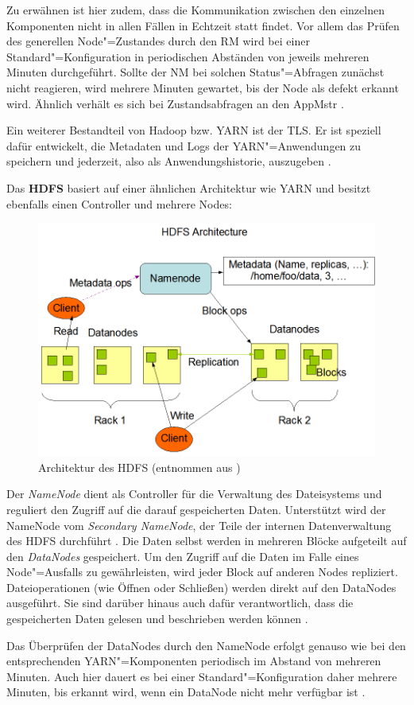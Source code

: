Zu erwähnen ist hier zudem, dass die Kommunikation zwischen den einzelnen Komponenten nicht in allen Fällen in Echtzeit statt findet.
Vor allem das Prüfen des generellen Node"=Zustandes durch den \ac{RM} wird bei einer Standard"=Konfiguration in periodischen Abständen von jeweils mehreren Minuten durchgeführt.
Sollte der \ac{NM} bei solchen Status"=Abfragen zunächst nicht reagieren, wird mehrere Minuten gewartet, bis der Node als defekt erkannt wird.
Ähnlich verhält es sich bei Zustandsabfragen an den \ac{AppMstr} \cite{HadoopYarnConfig271}.

Ein weiterer Bestandteil von Hadoop bzw. \ac{YARN} ist der \ac{TLS}.
Er ist speziell dafür entwickelt, die Metadaten und Logs der \ac{YARN}"=Anwendungen zu speichern und jederzeit, also als Anwendungshistorie, auszugeben \cite{HadoopYarnTlServer271}.

Das \textbf{\ac{HDFS}} basiert auf einer ähnlichen Architektur wie \ac{YARN} und besitzt ebenfalls einen Controller und mehrere Nodes:

\begin{figure}[h]
    \includegraphics{./images/hdfsarchitecture.png}
    \caption[Architektur des HDFS]
    {Architektur des \acs{HDFS} (entnommen aus \cite{HadoopHdfsDesc271})}
    \label{fig:hdfsarch}
\end{figure}

Der \emph{NameNode} dient als Controller für die Verwaltung des Dateisystems und reguliert den Zugriff auf die darauf gespeicherten Daten.
Unterstützt wird der NameNode vom \emph{Secondary NameNode}, der Teile der internen Datenverwaltung des \ac{HDFS} durchführt \cite{HadoopHdfsGuide271}.
Die Daten selbst werden in mehreren Blöcke aufgeteilt auf den \emph{DataNodes} gespeichert.
Um den Zugriff auf die Daten im Falle eines Node"=Ausfalls zu gewährleisten, wird jeder Block auf anderen Nodes repliziert.
Dateioperationen (wie Öffnen oder Schließen) werden direkt auf den DataNodes ausgeführt.
Sie sind darüber hinaus auch dafür verantwortlich, dass die gespeicherten Daten gelesen und beschrieben werden können \cite{HadoopHdfsDesc271}.

Das Überprüfen der DataNodes durch den NameNode erfolgt genauso wie bei den entsprechenden \ac{YARN}"=Komponenten periodisch im Abstand von mehreren Minuten.
Auch hier dauert es bei einer Standard"=Konfiguration daher mehrere Minuten, bis erkannt wird, wenn ein DataNode nicht mehr verfügbar ist \cite{HadoopHdfsConfig271}.
